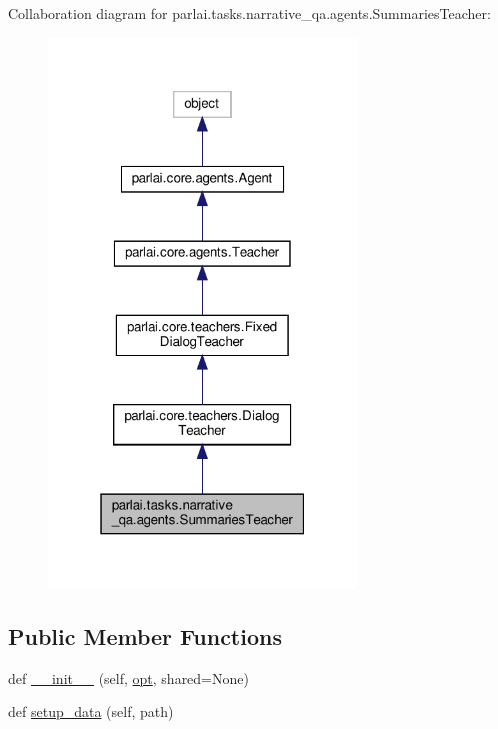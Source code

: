 Collaboration diagram for parlai.\+tasks.\+narrative\+\_\+qa.\+agents.\+Summaries\+Teacher\+:
\nopagebreak
\begin{figure}[H]
\begin{center}
\leavevmode
\includegraphics[width=232pt]{dd/dd2/classparlai_1_1tasks_1_1narrative__qa_1_1agents_1_1SummariesTeacher__coll__graph}
\end{center}
\end{figure}
\subsection*{Public Member Functions}
\begin{DoxyCompactItemize}
\item 
def \hyperlink{classparlai_1_1tasks_1_1narrative__qa_1_1agents_1_1SummariesTeacher_a833c2c54f6084e88dbe0a16151fc4a46}{\+\_\+\+\_\+init\+\_\+\+\_\+} (self, \hyperlink{classparlai_1_1core_1_1agents_1_1Teacher_a3ce6243860ce978a897922863ed32fa4}{opt}, shared=None)
\item 
def \hyperlink{classparlai_1_1tasks_1_1narrative__qa_1_1agents_1_1SummariesTeacher_a76f9cadca71b61d42c5997ba590f107e}{setup\+\_\+data} (self, path)
\end{DoxyCompactItemize}
